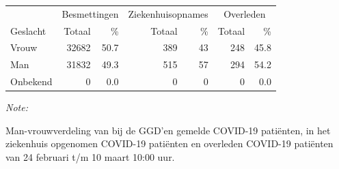 \documentclass[
  english,
  man,floatsintext]{apa6}
\begin{document}
\begin{table}
\centering\begingroup\fontsize{11}{13}\selectfont

\begin{threeparttable}
\begin{tabular}{lrrrrrr}
\toprule
\multicolumn{1}{c}{ } & \multicolumn{2}{c}{Besmettingen} & \multicolumn{2}{c}{Ziekenhuisopnames} & \multicolumn{2}{c}{Overleden} \\
\cmidrule(l{3pt}r{3pt}){2-3} \cmidrule(l{3pt}r{3pt}){4-5} \cmidrule(l{3pt}r{3pt}){6-7}
Geslacht & Totaal & \% & Totaal & \% & Totaal & \%\\
\midrule
Vrouw & 32682 & 50.7 & 389 & 43 & 248 & 45.8\\
Man & 31832 & 49.3 & 515 & 57 & 294 & 54.2\\
Onbekend & 0 & 0.0 & 0 & 0 & 0 & 0.0\\
\bottomrule
\end{tabular}
\begin{tablenotes}
\item \textit{Note: } 
\item Man-vrouwverdeling van bij de GGD’en gemelde COVID-19 patiënten, in het ziekenhuis opgenomen COVID-19 patiënten en overleden COVID-19 patiënten van 24 februari t/m 10 maart 10:00 uur.
\end{tablenotes}
\end{threeparttable}
\endgroup{}
\end{table}
\newpage
\end{document}
